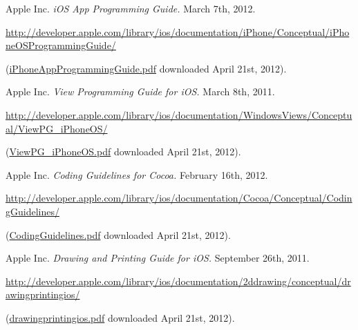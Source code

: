 \begin{thebibliography}{10}
 Apple Inc.  \textit{iOS App Programming Guide.} March 7th, 2012. 

\url{http://developer.apple.com/library/ios/documentation/iPhone/Conceptual/iPhoneOSProgrammingGuide/}

(\href{http://developer.apple.com/library/ios/documentation/iPhone/Conceptual/iPhoneOSProgrammingGuide/iPhoneAppProgrammingGuide.pdf} 
{iPhoneAppProgrammingGuide.pdf}
downloaded April 21st, 2012).

 Apple Inc.  \textit{View Programming Guide for iOS.} March 8th, 2011. 

\url{http://developer.apple.com/library/ios/documentation/WindowsViews/Conceptual/ViewPG_iPhoneOS/}

(\href{http://developer.apple.com/library/ios/documentation/WindowsViews/Conceptual/ViewPG_iPhoneOS/ViewPG_iPhoneOS.pdf}
{ViewPG\_iPhoneOS.pdf}
downloaded April 21st, 2012).

 Apple Inc.  \textit{Coding Guidelines for Cocoa.} February 16th, 2012. 

\url{http://developer.apple.com/library/ios/documentation/Cocoa/Conceptual/CodingGuidelines/}

(\href{http://developer.apple.com/library/ios/documentation/Cocoa/Conceptual/CodingGuidelines/CodingGuidelines.pdf}
{CodingGuidelines.pdf}
downloaded April 21st, 2012).

 Apple Inc.  \textit{Drawing and Printing Guide for iOS.} September 26th, 2011. 

\url{http://developer.apple.com/library/ios/documentation/2ddrawing/conceptual/drawingprintingios/}

(\href{http://developer.apple.com/library/ios/documentation/2ddrawing/conceptual/drawingprintingios/drawingprintingios.pdf}
{drawingprintingios.pdf}
downloaded April 21st, 2012).


%

\end{thebibliography}

